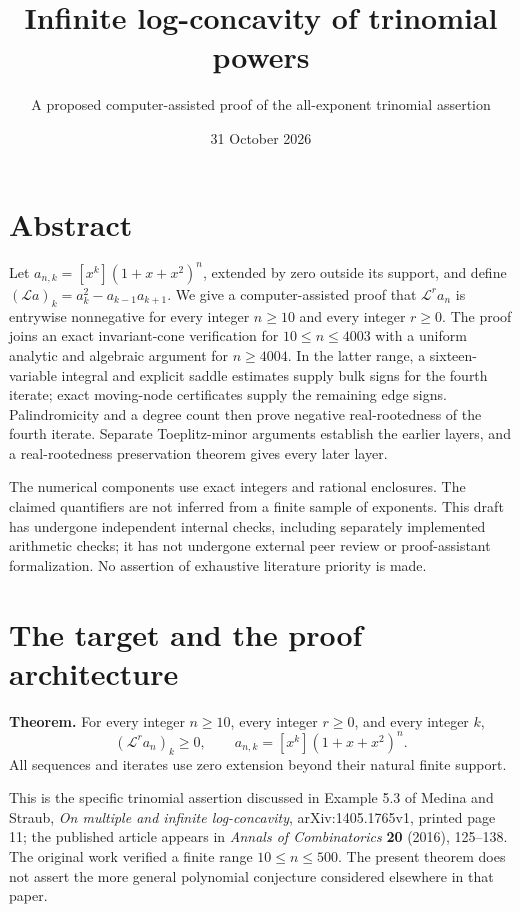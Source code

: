 \documentclass[
  11pt,
]{article}
\title{Infinite log-concavity of trinomial powers}
\subtitle{A proposed computer-assisted proof of the all-exponent
trinomial assertion}
\author{}
\date{31 October 2026}
\begin{document}
\maketitle

{
\hypersetup{linkcolor=}
\setcounter{tocdepth}{2}
\tableofcontents
}
\clearpage
\section{Abstract}\label{abstract}

Let \(a_{n,k}=[x^k](1+x+x^2)^n\), extended by zero outside its support,
and define \((\mathcal La)_k=a_k^2-a_{k-1}a_{k+1}\). We give a
computer-assisted proof that \(\mathcal L^r a_n\) is entrywise
nonnegative for every integer \(n\ge10\) and every integer \(r\ge0\).
The proof joins an exact invariant-cone verification for
\(10\le n\le4003\) with a uniform analytic and algebraic argument for
\(n\ge4004\). In the latter range, a sixteen-variable integral and
explicit saddle estimates supply bulk signs for the fourth iterate;
exact moving-node certificates supply the remaining edge signs.
Palindromicity and a degree count then prove negative real-rootedness of
the fourth iterate. Separate Toeplitz-minor arguments establish the
earlier layers, and a real-rootedness preservation theorem gives every
later layer.

The numerical components use exact integers and rational enclosures. The
claimed quantifiers are not inferred from a finite sample of exponents.
This draft has undergone independent internal checks, including
separately implemented arithmetic checks; it has not undergone external
peer review or proof-assistant formalization. No assertion of exhaustive
literature priority is made.

\section{The target and the proof
architecture}\label{the-target-and-the-proof-architecture}

\textbf{Theorem.} For every integer \(n\ge10\), every integer \(r\ge0\),
and every integer \(k\), \[
 (\mathcal L^r a_n)_k\ge0,
 \qquad a_{n,k}=[x^k](1+x+x^2)^n.
\] All sequences and iterates use zero extension beyond their natural
finite support.

This is the specific trinomial assertion discussed in Example 5.3 of
Medina and Straub, \emph{On multiple and infinite log-concavity},
arXiv:1405.1765v1, printed page 11; the published article appears in
\emph{Annals of Combinatorics} \textbf{20} (2016), 125--138. The
original work verified a finite range \(10\le n\le500\). The present
theorem does not assert the more general polynomial conjecture
considered elsewhere in that paper.
\end{document}
